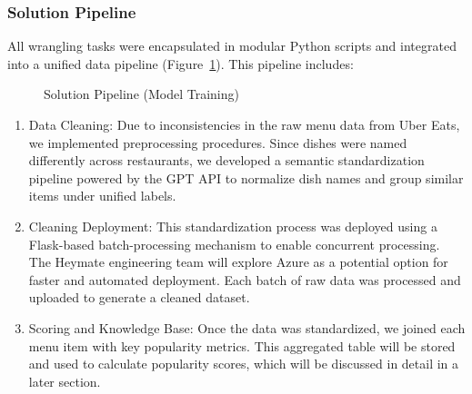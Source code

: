 \documentclass[
  11pt,
  a4paper,
  DIV=11,
  numbers=noendperiod]{scrartcl}
\providecommand{\tightlist}{%
  \setlength{\itemsep}{0pt}\setlength{\parskip}{0pt}}\usepackage{longtable,booktabs,array}
\begin{document}
\subsubsection{Solution Pipeline}\label{solution-pipeline}

All wrangling tasks were encapsulated in modular Python scripts and
integrated into a unified data pipeline
(Figure~\ref{fig-training-pipline}). This pipeline includes:

\begin{figure}

\caption{\label{fig-training-pipline}Solution Pipeline (Model Training)}


\end{figure}%

\begin{enumerate}
\def\labelenumi{\arabic{enumi}.}
\tightlist
\item
  Data Cleaning: Due to inconsistencies in the raw menu data from Uber
  Eats, we implemented preprocessing procedures. Since dishes were named
  differently across restaurants, we developed a semantic
  standardization pipeline powered by the GPT API to normalize dish
  names and group similar items under unified labels.
\item
  Cleaning Deployment: This standardization process was deployed using a
  Flask-based batch-processing mechanism to enable concurrent
  processing. The Heymate engineering team will explore Azure as a
  potential option for faster and automated deployment. Each batch of
  raw data was processed and uploaded to generate a cleaned dataset.
\item
  Scoring and Knowledge Base: Once the data was standardized, we joined
  each menu item with key popularity metrics. This aggregated table will
  be stored and used to calculate popularity scores, which will be
  discussed in detail in a later section.
\end{enumerate}
\end{document}
